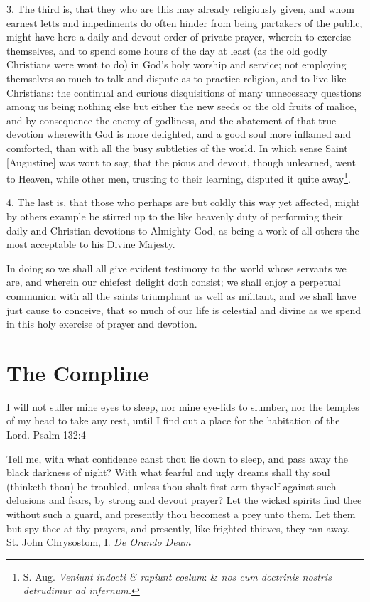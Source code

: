\documentclass{article}
\begin{document}
3. The third is, that they who are this may already religiously
given, and whom earnest letts
and impediments do often hinder from being partakers of the public,
might have here a daily
and devout order of private prayer, wherein to exercise themselves,
and to spend some hours of the day
at least (as the old godly Christians were wont to do) in God's holy
worship and service; not
employing themselves so much to talk and dispute as to practice
religion, and to live like Christians:
the continual and curious disquisitions of many unnecessary questions
among us being nothing else but either
the new seeds or the old fruits of malice, and by consequence the
enemy of godliness, and the abatement
of that true devotion wherewith God is more delighted, and a good
soul more inflamed and comforted,
than with all the busy subtleties of the world. In which sense Saint
[Augustine] was wont
to say, that the pious and devout, though unlearned, went to Heaven,
while other men,
trusting to their learning, disputed it quite away\footnote{S. Aug.
  \textit{Veniunt indocti \& rapiunt coelum}: \& \textit{nos cum
doctrinis nostris detrudimur ad infernum.}}.

4. The last is, that those who perhaps are but coldly this way yet
affected, might
by others example be stirred up to the like heavenly duty of
performing their daily and Christian
devotions to Almighty God, as being a work of all others the most
acceptable to his Divine Majesty.

In doing so we shall all give evident testimony to the world whose
servants we are,
and wherein our chiefest delight doth consist; we shall enjoy a
perpetual communion with all the saints triumphant
as well as militant, and we shall have just cause to conceive, that
so much of our life is celestial and divine
as we spend in this holy exercise of prayer and devotion.

\newpage
\section{The Compline}


\bibleverse
{I will not suffer mine eyes to sleep, nor mine eye-lids to slumber,
  nor the temples of my head to take any rest, until I find out a place for the
habitation of the Lord.}
{Psalm 132:4}

\bibleverse
{Tell me, with what confidence canst thou lie down to sleep, and pass away
  the black darkness of night? With what fearful and ugly dreams shall thy
  soul (thinketh thou) be troubled, unless thou shalt first arm thyself against
  such delusions and fears, by strong and devout prayer? Let the wicked spirits
  find thee without such a guard, and presently thou becomest a prey
  unto them. Let them
  but spy thee at thy prayers, and presently, like frighted thieves,
they ran away.}
{St. John Chrysostom, I. \textit{De Orando Deum}}
\end{document}
